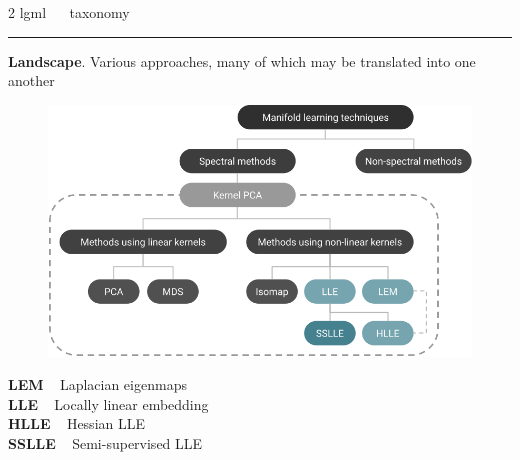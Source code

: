 \documentclass[11pt, compress, t, notes = noshow, xcolor = table, 
aspectratio = 1610]{beamer}
\newcommand{\highlight}[1]{\textcolor{highlightcol}{\textbf{#1}}}
\begin{document}
\LARGE
\begin{frame}{\textcolor{gray!90}{2 lgml} ~~ taxonomy}
\normalsize
\vspace{-0.5cm}
\noindent \textcolor{gray!90}{\rule{\textwidth}{1pt}}
\smallskip

\textbf{Landscape}. Various approaches, many of which may be translated into one
another

\vspace{0.5cm}

\begin{minipage}[b]{0.65\textwidth}
  \begin{figure}[H]
    \includegraphics[trim = 0 0 0 0, clip, %
      width = \textwidth]{figures/models_overview}
  \end{figure}
\end{minipage}%
\begin{minipage}[b]{0.35\textwidth}
  \highlight{LEM} ~ Laplacian eigenmaps \\
  \highlight{LLE} ~ Locally linear embedding \\
  \highlight{HLLE} ~ Hessian LLE \\
  \highlight{SSLLE} ~ Semi-supervised LLE 
\end{minipage}

\end{frame}

\end{document}
